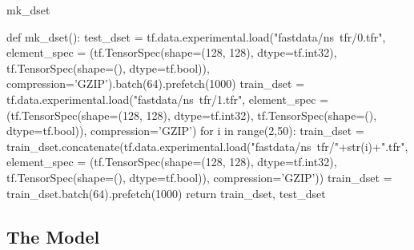 \documentclass[10pt, a4paper]{article}
\begin{document}
\begin{codeblock}{mk_dset}
\begin{code}
def mk_dset():
	test_dset = tf.data.experimental.load("fastdata/ns~tfr/0.tfr",
	                                      element_spec = (tf.TensorSpec(shape=(128, 128), dtype=tf.int32),
	                                                      tf.TensorSpec(shape=(), dtype=tf.bool)),
	                                      compression='GZIP').batch(64).prefetch(1000)
	train_dset = tf.data.experimental.load("fastdata/ns~tfr/1.tfr",
	                                       element_spec = (tf.TensorSpec(shape=(128, 128), dtype=tf.int32),
	                                                       tf.TensorSpec(shape=(), dtype=tf.bool)),
	                                       compression='GZIP')
	for i in range(2,50):
		train_dset = train_dset.concatenate(tf.data.experimental.load("fastdata/ns~tfr/"+str(i)+".tfr",
	                                       element_spec = (tf.TensorSpec(shape=(128, 128), dtype=tf.int32),
	                                                       tf.TensorSpec(shape=(), dtype=tf.bool)),
	                                       compression='GZIP'))
	train_dset = train_dset.batch(64).prefetch(1000)
	return train_dset, test_dset
\end{code}

	
\end{codeblock}

\subsection{The Model}
\end{document}
